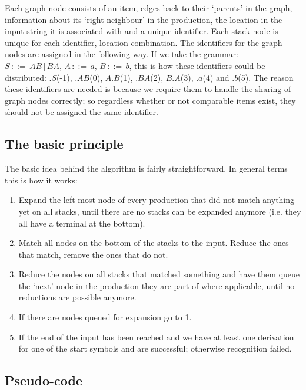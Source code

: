 \documentclass[a4paper,10pt]{article}
\begin{document}
Each graph node consists of an item, edges back to their `parents' in the graph, information about its `right neighbour' in the production, the location in the input string it is associated with and a unique identifier. Each stack node is unique for each identifier, location combination. The identifiers for the graph nodes are assigned in the following way. If we take the grammar: $S\,::=\,AB\,|\,BA,\,A\,::=\,a,\,B\,::=\,b$, this is how these identifiers could be distributed: $.S$(-1), $.AB$(0), $A.B$(1), $.BA$(2), $B.A$(3), $.a$(4) and $.b$(5). The reason these identifiers are needed is because we require them to handle the sharing of graph nodes correctly; so regardless whether or not comparable items exist, they should not be assigned the same identifier.

\subsection{The basic principle}

The basic idea behind the algorithm is fairly straightforward. In general terms this is how it works:

\begin{enumerate}
 \setlength{\itemsep}{0pt}
 \setlength{\parskip}{0pt}
 \setlength{\parsep}{0pt}

 \item Expand the left most node of every production that did not match anything yet on all stacks, until there are no stacks can be expanded anymore (i.e. they all have a terminal at the bottom).
 \item Match all nodes on the bottom of the stacks to the input. Reduce the ones that match, remove the ones that do not.
 \item Reduce the nodes on all stacks that matched something and have them queue the `next' node in the production they are part of where applicable, until no reductions are possible anymore.
 \item If there are nodes queued for expansion go to 1.
 \item If the end of the input has been reached and we have at least one derivation for one of the start symbols and are successful; otherwise recognition failed.
\end{enumerate}

\pagebreak
\subsection{Pseudo-code}
\end{document}
